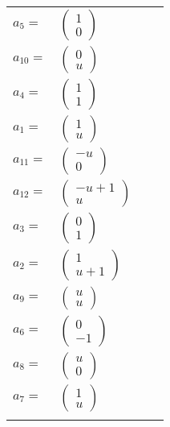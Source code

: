 \documentclass[1p]{elsarticle_modified}
\theoremstyle{definition}
\begin{document}
\begin{tabular}{m{7pt} m{180pt} m{7pt} m{180pt} }
\flushright $a_{5}=$&$\begin{pmatrix}1\\0\end{pmatrix}$ \\
\flushright $a_{10}=$&$\begin{pmatrix}0\\u\end{pmatrix}$ \\
\flushright $a_{4}=$&$\begin{pmatrix}1\\1\end{pmatrix}$ \\
\flushright $a_{1}=$&$\begin{pmatrix}1\\u\end{pmatrix}$ \\
\flushright $a_{11}=$&$\begin{pmatrix}- u\\0\end{pmatrix}$ \\
\flushright $a_{12}=$&$\begin{pmatrix}- u+1\\u\end{pmatrix}$ \\
\flushright $a_{3}=$&$\begin{pmatrix}0\\1\end{pmatrix}$ \\
\flushright $a_{2}=$&$\begin{pmatrix}1\\u+1\end{pmatrix}$ \\
\flushright $a_{9}=$&$\begin{pmatrix}u\\u\end{pmatrix}$ \\
\flushright $a_{6}=$&$\begin{pmatrix}0\\-1\end{pmatrix}$ \\
\flushright $a_{8}=$&$\begin{pmatrix}u\\0\end{pmatrix}$ \\
\flushright $a_{7}=$&$\begin{pmatrix}1\\u\end{pmatrix}$\\&\end{tabular}
\end{document}
